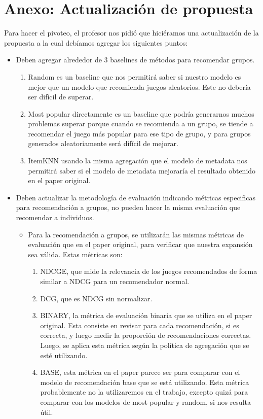 \documentclass[11pt]{article}
\begin{document}
\section{Anexo: Actualización de propuesta}
Para hacer el pivoteo, el profesor nos pidió que hiciéramos una actualización de la propuesta a la cual debíamos agregar los siguientes puntos:
\begin{itemize}
    \item Deben agregar alrededor de 3 baselines de métodos para recomendar grupos.
    \begin{enumerate}
        \item Random es un baseline que nos permitirá saber si nuestro modelo es mejor que un modelo que recomienda juegos aleatorios. Este no debería ser difícil de superar.
        \item Most popular directamente es un baseline que podría generarnos muchos problemas superar porque cuando se recomienda a un grupo, se tiende a recomendar el juego más popular para ese tipo de grupo, y para grupos generados aleatoriamente será difícil de mejorar.
        \item ItemKNN usando la misma agregación que el modelo de metadata nos permitirá saber si el modelo de metadata mejoraría el resultado obtenido en el paper original.
    \end{enumerate}
    \item Deben actualizar la metodología de evaluación indicando métricas especificas para recomendación a grupos, no pueden hacer la misma evaluación que recomendar a individuos.
    \begin{itemize}
        \item Para la recomendación a grupos, se utilizarán las mismas métricas de evaluación que en el paper original, para verificar que nuestra expansión sea válida. Estas métricas son:
        \begin{enumerate}
            \item NDCGE, que mide la relevancia de los juegos recomendados de forma similar a NDCG para un recomendador normal.
            \item DCG, que es NDCG sin normalizar.
            \item BINARY, la métrica de evaluación binaria que se utiliza en el paper original. Esta consiste en revisar para cada recomendación, si es correcta, y luego medir la proporción de recomendaciones correctas. Luego, se aplica esta métrica según la política de agregación que se esté utilizando. 
            \item BASE, esta métrica en el paper parece ser para comparar con el modelo de recomendación base que se está utilizando. Esta métrica probablemente no la utilizaremos en el trabajo, excepto quizá para comparar con los modelos de most popular y random, si nos resulta útil.
        \end{enumerate}
    \end{itemize}
\end{itemize}
\end{document}
